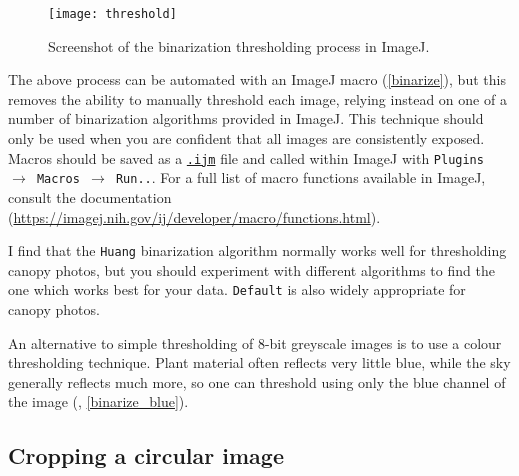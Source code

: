 \documentclass{article}
\newcommand\menu[1]{\texttt{\color{blue}#1}}
\newcommand\file[1]{\texttt{\underline{#1}}}
\begin{document}
\begin{figure}[H]
\centering
	\texttt{[image: threshold]}
	\caption{Screenshot of the binarization thresholding process in ImageJ.}
	\label{threshold}
\end{figure}

The above process can be automated with an ImageJ macro (\autoref{binarize}), but this removes the ability to manually threshold each image, relying instead on one of a number of binarization algorithms provided in ImageJ. This technique should only be used when you are confident that all images are consistently exposed. Macros should be saved as a \file{.ijm} file and called within ImageJ with \menu{Plugins $\rightarrow$ Macros $\rightarrow$ Run..}. For a full list of macro functions available in ImageJ, consult the documentation (\url{https://imagej.nih.gov/ij/developer/macro/functions.html}). 

\begin{minipage}{\linewidth}

\end{minipage}

I find that the \verb|Huang| \citep{Huang1995} binarization algorithm normally works well for thresholding canopy photos, but you should experiment with different algorithms to find the one which works best for your data. \verb|Default| is also widely appropriate for canopy photos.

An alternative to simple thresholding of 8-bit greyscale images is to use a colour thresholding technique. Plant material often reflects very little blue, while the sky generally reflects much more, so one can threshold using only the blue channel of the image (\citealt{Brusa2014}, \autoref{binarize_blue}).

\begin{minipage}{\linewidth}

\end{minipage}

\subsection{Cropping a circular image} \label{circle}
\end{document}
